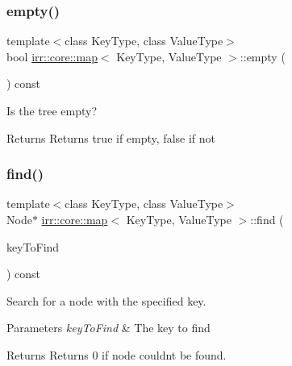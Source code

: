 \subsubsection{\texorpdfstring{empty()}{empty()}}
{\footnotesize\ttfamily template$<$class Key\+Type, class Value\+Type$>$ \\
bool \hyperlink{classirr_1_1core_1_1map}{irr\+::core\+::map}$<$ Key\+Type, Value\+Type $>$\+::empty (\begin{DoxyParamCaption}{ }\end{DoxyParamCaption}) const\hspace{0.3cm}{\ttfamily [inline]}}



Is the tree empty? 

\begin{DoxyReturn}{Returns}
Returns true if empty, false if not 
\end{DoxyReturn}
\mbox{\label{classirr_1_1core_1_1map_ad6a62579dceda1da7605ee78bca3e318}} 
\subsubsection{\texorpdfstring{find()}{find()}}
{\footnotesize\ttfamily template$<$class Key\+Type, class Value\+Type$>$ \\
Node$\ast$ \hyperlink{classirr_1_1core_1_1map}{irr\+::core\+::map}$<$ Key\+Type, Value\+Type $>$\+::find (\begin{DoxyParamCaption}\item[{const Key\+Type \&}]{key\+To\+Find }\end{DoxyParamCaption}) const\hspace{0.3cm}{\ttfamily [inline]}}



Search for a node with the specified key. 


\begin{DoxyParams}{Parameters}
{\em key\+To\+Find} & The key to find \\
\hline
\end{DoxyParams}
\begin{DoxyReturn}{Returns}
Returns 0 if node couldn\textquotesingle{}t be found. 
\end{DoxyReturn}
\mbox{\label{classirr_1_1core_1_1map_a6666acf9724e2e20cd338a6a5ff66c65}} 
